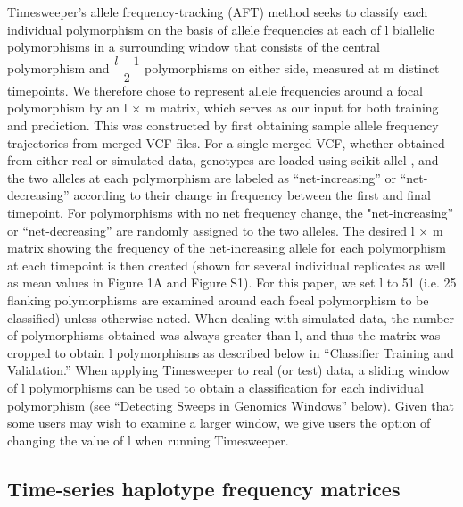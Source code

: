 Timesweeper’s allele frequency-tracking (AFT) method seeks to classify each individual polymorphism on the basis of allele frequencies at each of l biallelic polymorphisms in a surrounding window that consists of the central polymorphism and $\dfrac{l-1}{2}$ polymorphisms on either side, measured at m distinct timepoints. We therefore chose to represent allele frequencies around a focal polymorphism by an l × m matrix, which serves as our input for both training and prediction. This was constructed by first obtaining sample allele frequency trajectories from merged VCF files. For a single merged VCF, whether obtained from either real or simulated data, genotypes are loaded using scikit-allel \cite{milesCgghScikitallelV12021}, and the two alleles at each polymorphism are labeled as “net-increasing” or “net-decreasing” according to their change in frequency between the first and final timepoint. For polymorphisms with no net frequency change, the "net-increasing” or “net-decreasing” are randomly assigned to the two alleles. The desired l × m matrix showing the frequency of the net-increasing allele for each polymorphism at each timepoint is then created (shown for several individual replicates as well as mean values in Figure 1A and Figure S1). For this paper, we set l to 51 (i.e. 25 flanking polymorphisms are examined around each focal polymorphism to be classified) unless otherwise noted. When dealing with simulated data, the number of polymorphisms obtained was always greater than l, and thus the matrix was cropped to obtain l polymorphisms as described below in “Classifier Training and Validation.” When applying Timesweeper to real (or test) data, a sliding window of l polymorphisms can be used to obtain a classification for each individual polymorphism (see “Detecting Sweeps in Genomics Windows” below). Given that some users may wish to examine a larger window, we give users the option of changing the value of l when running Timesweeper. \\

\subsection{Time-series haplotype frequency matrices}

